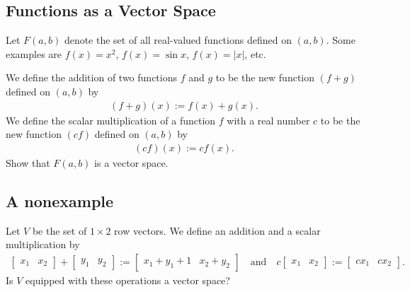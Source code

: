 \documentclass[12pt,a4paper]{article}
\newcounter{example}[section]
\begin{document}
	\vspace*{6cm}
	
	\subsection{Functions as a Vector Space}
	\begin{example}
	Let $F(a, b)$ denote the set of all real-valued functions defined on $(a, b)$. Some examples are $f(x) = x^2$, $f(x) = \sin x$, $f(x) = |x|$, etc.
	
	We define the addition of two functions $f$ and $g$ to be the new function $(f + g)$ defined on $(a, b)$ by
		\begin{align*}
		(f + g) (x) := f(x) + g(x) .
		\end{align*}
	We define the scalar multiplication of a function $f$ with a real number $c$ to be the new function $(cf)$ defined on $(a, b)$ by
		\begin{align*}
		(cf) (x) := c f(x) .
		\end{align*}
	Show that $F(a, b)$ is a vector space.
	\end{example}
	
	\newpage
	
	\phantom{2}
	
	\newpage
	
	\subsection{A nonexample}
	\begin{example}
	Let $V$ be the set of $1 \times 2$ row vectors. We define an addition and a scalar multiplication by
		\begin{align*}
		\begin{bmatrix}
		x_1 & x_2
		\end{bmatrix}
		+ 
		\begin{bmatrix}
		y_1 & y_2
		\end{bmatrix}
		 := \begin{bmatrix}
		 x_1 + y_1 + 1 & x_2 + y_2
		 \end{bmatrix}
		 \quad \text{and} \quad
		 c \begin{bmatrix}
		 x_1 & x_2
		 \end{bmatrix}
		 := \begin{bmatrix}
		 cx_1 & c x_2 
		 \end{bmatrix} .
		\end{align*}
	Is $V$ equipped with these operations a vector space?
	\end{example}
	
\end{document}
